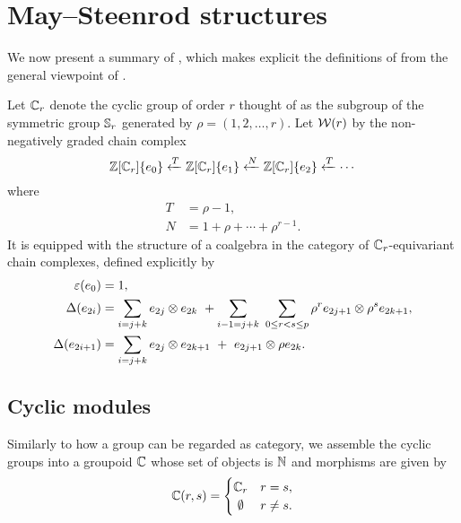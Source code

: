 
\section{May--Steenrod structures}

We now present a summary of \cite{medina2021may_st}, which makes explicit the definitions of \cite{steenrod1953cyclic} from the general viewpoint of \cite{may1970general}.

\sssec\label{sss:minimal resolution}

Let $\mathbb{C}_r$ denote the cyclic group of order $r$ thought of as the subgroup of the symmetric group $\mathbb{S}_r$ generated by $\rho = (1,2,\dots,r)$.
Let $\mathcal{W}(r)$ by the non-negatively graded chain complex
\begin{equation} \label{eq: minimal resolution}
	\mathbb{Z}[\mathbb{C}_r]\{e_0\} \xleftarrow{T} \mathbb{Z}[\mathbb{C}_r]\{e_1\} \xleftarrow{N} \mathbb{Z}[\mathbb{C}_r]\{e_2\} \xleftarrow{T} \cdots
\end{equation}
where
\begin{equation} \label{eq: T and R definition}
	\begin{split}
		T &= \rho - 1, \\
		N &= 1 + \rho + \cdots + \rho^{r-1}.
	\end{split}
\end{equation}
It is equipped with the structure of a coalgebra in the category of $\mathbb{C}_r$-equivariant chain complexes, defined explicitly by
\begin{align*}
	\varepsilon(e_0) &= 1, \\
	\Delta(e_{2i}) &=
	\sum_{i=j+k} e_{2j} \otimes e_{2k} \ + \sum_{i-1=j+k} \ \sum_{0 \leq r < s \leq p} \rho^r e_{2j+1} \otimes \rho^s e_{2k+1}, \\
	\Delta(e_{2i+1}) &=
	\sum_{i=j+k} e_{2j} \otimes e_{2k+1} \ +\ e_{2j+1} \otimes \rho e_{2k}.
\end{align*}

%

\subsection{Cyclic modules}

Similarly to how a group can be regarded as category, we assemble the cyclic groups into a groupoid $\mathbb{C}$ whose set of objects is $\mathbb{N}$ and morphisms are given by
\[
\cyc(r,s) =
\begin{cases}
	\cyc_r & r = s, \\
	\hfil \emptyset & r \neq s.
\end{cases}
\]

